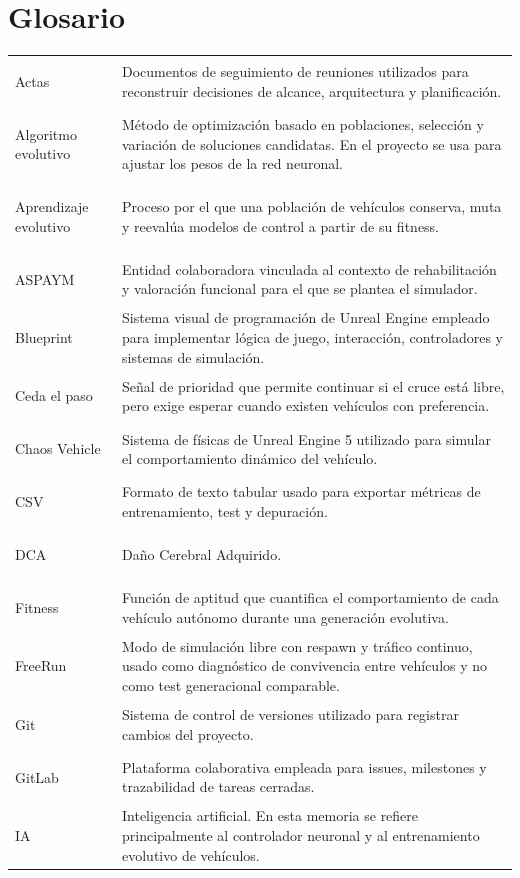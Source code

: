 \chapter*{Glosario}

\begin{longtable}{>{\bfseries\raggedright\arraybackslash}p{3.4cm}L{10.6cm}}
Actas & Documentos de seguimiento de reuniones utilizados para reconstruir decisiones de alcance, arquitectura y planificación.\\
Algoritmo evolutivo & Método de optimización basado en poblaciones, selección y variación de soluciones candidatas. En el proyecto se usa para ajustar los pesos de la red neuronal.\\
Aprendizaje evolutivo & Proceso por el que una población de vehículos conserva, muta y reevalúa modelos de control a partir de su fitness.\\
ASPAYM & Entidad colaboradora vinculada al contexto de rehabilitación y valoración funcional para el que se plantea el simulador.\\
Blueprint & Sistema visual de programación de Unreal Engine empleado para implementar lógica de juego, interacción, controladores y sistemas de simulación.\\
Ceda el paso & Señal de prioridad que permite continuar si el cruce está libre, pero exige esperar cuando existen vehículos con preferencia.\\
Chaos Vehicle & Sistema de físicas de Unreal Engine 5 utilizado para simular el comportamiento dinámico del vehículo.\\
CSV & Formato de texto tabular usado para exportar métricas de entrenamiento, test y depuración.\\
DCA & Daño Cerebral Adquirido.\\
Fitness & Función de aptitud que cuantifica el comportamiento de cada vehículo autónomo durante una generación evolutiva.\\
FreeRun & Modo de simulación libre con respawn y tráfico continuo, usado como diagnóstico de convivencia entre vehículos y no como test generacional comparable.\\
Git & Sistema de control de versiones utilizado para registrar cambios del proyecto.\\
GitLab & Plataforma colaborativa empleada para issues, milestones y trazabilidad de tareas cerradas.\\
IA & Inteligencia artificial. En esta memoria se refiere principalmente al controlador neuronal y al entrenamiento evolutivo de vehículos.\\

\end{longtable}
